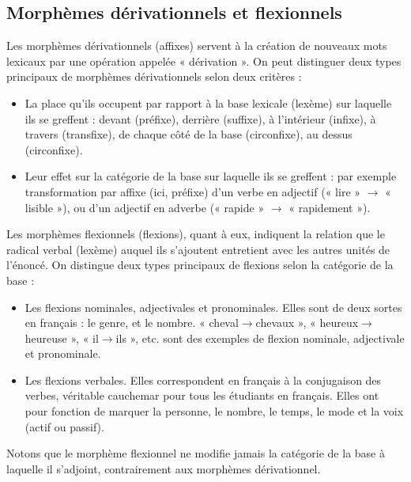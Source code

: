 \subsection{Morphèmes dérivationnels et flexionnels}
Les morphèmes dérivationnels (affixes) servent à la création de nouveaux mots lexicaux par une opération appelée « dérivation ». On peut distinguer deux types principaux de morphèmes dérivationnels selon deux critères :
\begin{itemize}
\item La place qu’ils occupent par rapport à la base lexicale (lexème) sur laquelle ils se greffent : devant (préfixe), derrière (suffixe), à l’intérieur (infixe), à travers (transfixe), de chaque côté de la base (circonfixe), au dessus (circonfixe).
\item Leur effet sur la catégorie de la base sur laquelle ils se greffent : par exemple transformation par affixe (ici, préfixe) d’un verbe en adjectif (« lire » $\rightarrow$ « lisible »), ou d’un adjectif en adverbe (« rapide » $\rightarrow$ « rapidement »).
\end{itemize}
Les morphèmes flexionnels (flexions), quant à eux, indiquent la relation que le radical verbal (lexème) auquel ils s’ajoutent entretient avec les autres unités de l’énoncé. On distingue deux types principaux de flexions selon la catégorie de la base :
\begin{itemize}
\item Les flexions nominales, adjectivales et pronominales. Elles sont de deux sortes en français : le genre, et le nombre. « cheval$\rightarrow$chevaux », « heureux$\rightarrow$heureuse », « il$\rightarrow$ils », etc. sont des exemples de flexion nominale, adjectivale et pronominale.
\item Les flexions verbales. Elles correspondent en français à la conjugaison des verbes, véritable cauchemar pour tous les étudiants en français. Elles ont pour fonction de marquer la personne, le nombre, le temps, le mode et la voix (actif ou passif).
\end{itemize}
Notons que le morphème flexionnel ne modifie jamais la catégorie de la base à laquelle il s’adjoint, contrairement aux morphèmes dérivationnel.

